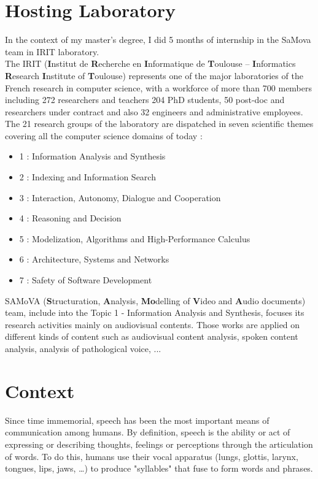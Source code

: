 \section{Hosting Laboratory}
In the context of my master's degree, I did 5 months of internship in the SaMova team in IRIT laboratory.\\

The IRIT (\textbf{I}nstitut de \textbf{R}echerche en \textbf{I}nformatique de \textbf{T}oulouse – \textbf{I}nformatics \textbf{R}esearch \textbf{I}nstitute of \textbf{T}oulouse) represents one of the major laboratories of the French research in computer science, with a workforce of more than 700 members including 272 researchers and teachers 204 PhD students, 50 post-doc and researchers under contract and also 32 engineers and administrative employees.\\
The 21 research groups of the laboratory are dispatched in seven scientific themes covering all the computer science domains of today :
\begin{itemize}
 \item 1 : Information Analysis and Synthesis
 \item 2 : Indexing and Information Search
 \item 3 : Interaction, Autonomy, Dialogue and Cooperation
 \item 4 : Reasoning and Decision
 \item 5 : Modelization, Algorithms and High-Performance Calculus
 \item 6 : Architecture, Systems and Networks
 \item 7 : Safety of Software Development
 
\end{itemize}

SAMoVA (\textbf{S}tructuration, \textbf{A}nalysis, \textbf{Mo}delling of \textbf{V}ideo and \textbf{A}udio documents) team, include into the Topic 1 - Information Analysis and Synthesis, focuses its research activities mainly on audiovisual contents. Those works are applied on different kinds of content such as audiovisual content analysis, spoken content analysis, analysis of pathological voice, ...\\

\section{Context}

Since time immemorial, speech has been the most important means of communication among humans. By definition, speech is the ability or act of expressing or describing thoughts, feelings or perceptions through the articulation of words. To do this, humans use their vocal apparatus (lungs, glottis, larynx, tongues, lips, jaws, \dots) to produce "syllables" that fuse to form words and phrases. \newline

